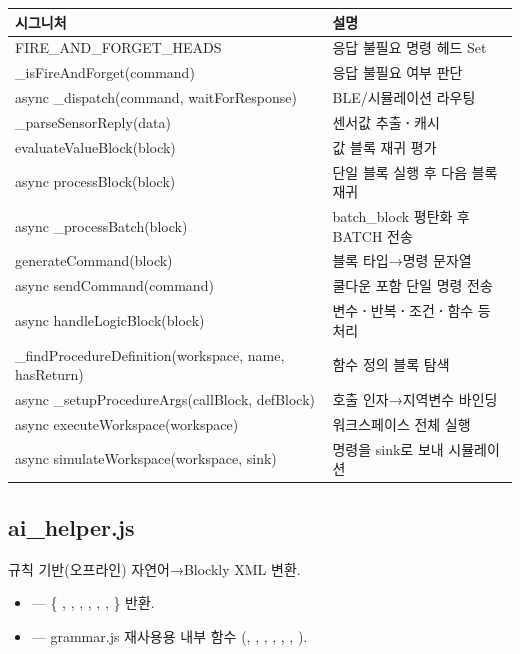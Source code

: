 \begin{longtable}{S{8.8cm} L{5.2cm}}
\toprule
{}\normalfont\sffamily\bfseries 시그니처 & \normalfont\sffamily\bfseries 설명 \\
\midrule
\endhead
FIRE\_AND\_FORGET\_HEADS & 응답 불필요 명령 헤드 Set \\
\_isFireAndForget(command) & 응답 불필요 여부 판단 \\
async \_dispatch(command, waitForResponse) & BLE/시뮬레이션 라우팅 \\
\_parseSensorReply(data) & 센서값 추출\textbf{·}캐시 \\
evaluateValueBlock(block) & 값 블록 재귀 평가 \\
async processBlock(block) & 단일 블록 실행 후 다음 블록 재귀 \\
async \_processBatch(block) & batch\_block 평탄화 후 BATCH 전송 \\
generateCommand(block) & 블록 타입→명령 문자열 \\
async sendCommand(command) & 쿨다운 포함 단일 명령 전송 \\
async handleLogicBlock(block) & 변수\textbf{·}반복\textbf{·}조건\textbf{·}함수 등 처리 \\
\_findProcedureDefinition(workspace, name, hasReturn) & 함수 정의 블록 탐색 \\
async \_setupProcedureArgs(callBlock, defBlock) & 호출 인자→지역변수 바인딩 \\
async executeWorkspace(workspace) & 워크스페이스 전체 실행 \\
async simulateWorkspace(workspace, sink) & 명령을 sink로 보내 시뮬레이션 \\
\bottomrule
\end{longtable}

\subsection{ai\_helper.js}

규칙 기반(오프라인) 자연어→Blockly XML 변환.
\begin{itemize}
  \item {} --- \{ , , ,
        , , ,  \} 반환.
  \item {} --- grammar.js 재사용용 내부 함수
        (, , ,
        , , ,
        ).
\end{itemize}


